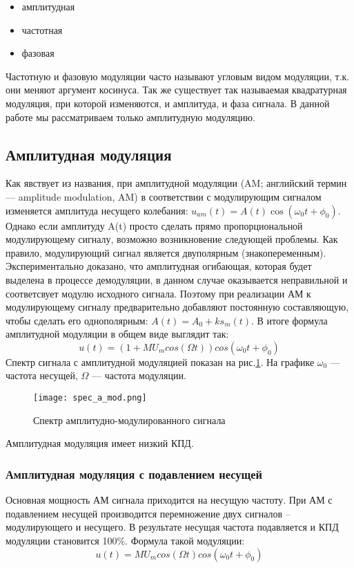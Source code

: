 \begin{itemize}
	\item амплитудная
	\item частотная
	\item фазовая
\end{itemize}   

Частотную и фазовую модуляции часто называют угловым видом модуляции, т.к. они меняют аргумент косинуса. Так же существует так называемая квадратурная модуляция, при которой изменяются, и амплитуда, и фаза сигнала. 
В данной работе мы рассматриваем только амплитудную модуляцию.

\subsection{Амплитудная модуляция}
Как явствует из названия, при амплитудной модуляции (AM; английский термин — amplitude modulation, AM) в соответствии с модулирующим сигналом изменяется амплитуда несущего колебания:
$ u_{am}(t) =  A(t) \cos( \omega_0 t + \phi_0)$.
Однако если амплитуду A(t) просто сделать прямо пропорциональной модулирующему сигналу, возможно возникновение следующей проблемы. Как правило, модулирующий сигнал является двуполярным (знакопеременным). Экспериментально доказано, что амплитудная огибающая, которая будет выделена в процессе демодуляции, в данном случае оказывается неправильной и соответсвует модулю исходного сигнала. Поэтому при реализации АМ к модулирующему сигналу предварительно добавляют постоянную составляющую, чтобы сделать его однополярным: $ A(t) =  A_0 + ks_m(t) $.
В итоге формула амплитудной модуляции в общем виде выглядит так: 
\begin{equation}\label{eq01}
	u(t) = (1 + M U_m cos(\Omega t)) cos(\omega_0 t + \phi _0)
\end{equation}
Спектр сигнала с амплитудной модуляцией показан на рис.\ref{pic:pic001_spec_amtheor}.
На графике $\omega_0$ --- частота несущей, $\Omega$ --- частота модуляции.
\begin{figure}[H]
	\begin{center}
		\texttt{[image: spec\_a\_mod.png]}
		\caption{Спектр амплитудно-модулированного сигнала} 
		\label{pic:pic001_spec_amtheor} %
	\end{center}
\end{figure}

Амплитудная модуляция имеет низкий КПД.

\subsubsection{Амплитудная модуляция с подавлением несущей}
Основная мощность АМ сигнала приходится на несущую частоту. При АМ с подавлением несущей производится перемножение двух сигналов – модулирующего и несущего. В результате несущая частота подавляется и КПД модуляции становится 100\%.
Формула такой модуляции:
\begin{equation}\label{eq02}
	u(t) = M U_m cos(\Omega t) cos(\omega_0 t + \phi _0)
\end{equation}

